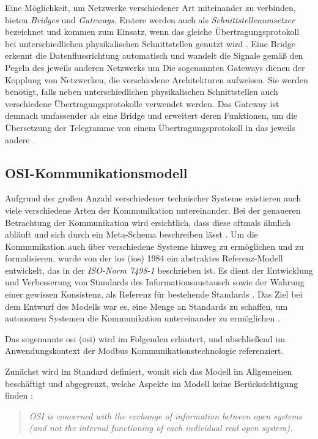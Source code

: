 Eine Möglichkeit, um Netzwerke verschiedener Art miteinander zu verbinden, bieten \textit{Bridges} und \textit{Gateways}. Erstere werden auch als \textit{Schnittstellenumsetzer} bezeichnet und kommen zum Einsatz, wenn das gleiche Übertragungsprotokoll bei unterschiedlichen physikalischen Schnittstellen genutzt wird \cite[S.~80f.]{schn06}. Eine Bridge erkennt die Datenflussrichtung automatisch und wandelt die Signale gemäß den Pegeln des jeweils anderen Netzwerks um \cite[S.~21]{sch08}
Die sogenannten Gateways dienen der Kopplung von Netzwerken, die verschiedene Architekturen aufweisen. Sie werden benötigt, falls neben unterschiedlichen physikalischen Schnittstellen auch verschiedene Übertragungsprotokolle verwendet werden. Das Gateway ist demnach umfassender als eine Bridge und erweitert deren Funktionen, um die Übersetzung der Telegramme von einem Übertragungsprotokoll in das jeweils andere \cite[S.~84f.]{schn06}.


\subsection{OSI-Kommunikationsmodell}

Aufgrund der großen Anzahl verschiedener technischer Systeme existieren auch viele verschiedene Arten der Kommunikation untereinander. Bei der genaueren Betrachtung der Kommunikation wird ersichtlich, dass diese oftmals ähnlich abläuft und sich durch ein Meta-Schema beschreiben lässt \cite[S.~8]{schn06}. Um die Kommunikation auch über verschiedene Systeme hinweg zu ermöglichen und zu formalisieren, wurde von der \acrlong{ios} (\acrshort{ios}) 1984 ein abstraktes Referenz-Modell entwickelt, das in der \textit{ISO-Norm 7498-1} beschrieben ist. Es dient der Entwicklung und Verbesserung von Standards des Informationsaustausch sowie der Wahrung einer gewissen Konsistenz, als Referenz für bestehende Standards \cite[S.~1]{osi96}. Das Ziel bei dem Entwurf des Modells war es, eine Menge an Standards zu schaffen, um autonomen Systemen die Kommunikation untereinander zu ermöglichen \cite[S.~4]{osi96}.

Das sogenannte \acrlong{osi} (\acrshort{osi}) wird im Folgenden erläutert, und abschließend im Anwendungskontext der Modbus Kommunikationstechnologie referenziert.

Zunächst wird im Standard definiert, womit sich das Modell im Allgemeinen beschäftigt und abgegrenzt, welche Aspekte im Modell keine Berücksichtigung finden \cite[S.~3]{osi96}:
\begin{quote}
\textit{\Gun OSI is concerned with the exchange of information between open systems (and not the internal functioning of each individual real open system).\Gob}
\end{quote}

